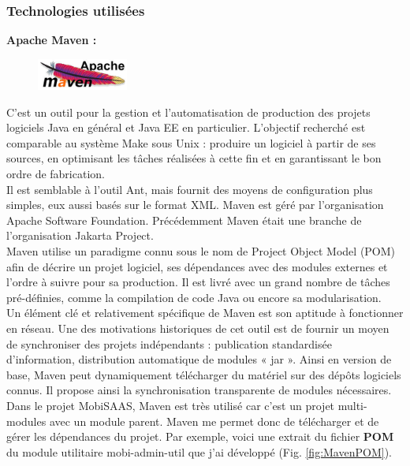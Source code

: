 \begin{itemize}
\subsubsection{Technologies utilisées}\label{MobiSAASTechno}

\textbf{Apache Maven : } \label{Maven}

\begin{figure}
\centering
\includegraphics[width=3cm]{images/apacheMaven.jpg}
\end{figure}
\noindent C'est un outil pour la gestion et l'automatisation de production des projets logiciels Java en général et Java EE en particulier. L'objectif recherché est comparable au système Make sous Unix : produire un logiciel à partir de ses sources, en optimisant les tâches réalisées à cette fin et en garantissant le bon ordre de fabrication.\\
Il est semblable à l'outil Ant, mais fournit des moyens de configuration plus simples, eux aussi basés sur le format XML. Maven est géré par l'organisation Apache Software Foundation. Précédemment Maven était une branche de l'organisation Jakarta Project.\\
Maven utilise un paradigme connu sous le nom de Project Object Model (POM) afin de décrire un projet logiciel, ses dépendances avec des modules externes et l'ordre à suivre pour sa production. Il est livré avec un grand nombre de tâches pré-définies, comme la compilation de code Java ou encore sa modularisation.\\
Un élément clé et relativement spécifique de Maven est son aptitude à fonctionner en réseau. Une des motivations historiques de cet outil est de fournir un moyen de synchroniser des projets indépendants : publication standardisée d'information, distribution automatique de modules « jar ». Ainsi en version de base, Maven peut dynamiquement télécharger du matériel sur des dépôts logiciels connus. Il propose ainsi la synchronisation transparente de modules nécessaires.\\

Dans le projet MobiSAAS, Maven est très utilisé car c'est un projet multi-modules avec un module parent. Maven me permet donc de télécharger et de gérer les dépendances du projet. Par exemple, voici une extrait du fichier \textbf{POM} du module utilitaire \og mobi-admin-util \fg que j'ai développé (Fig. \ref{fig:MavenPOM}).\\


\end{itemize}
